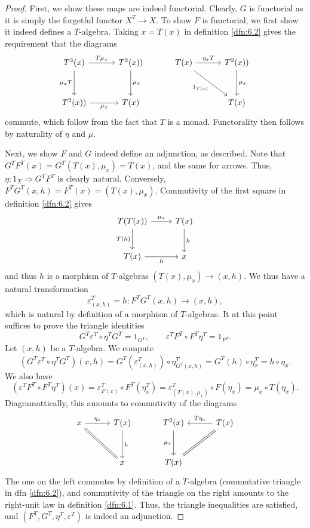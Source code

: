 \begin{proof}
	First, we show these maps are indeed functorial. Clearly, $G$ is functorial as it is simply the forgetful functor $X^T \to X$. To show $F$ is functorial, we first show it indeed defines a $T$-algebra. Taking $x=T(x)$ in definition \ref{dfn:6.2} gives the requirement that the diagrams
	\[\begin{tikzcd}[row sep = 3em, column sep = 3em]
	T^3(x)\ar[" T\mu_x ", r] \ar[" \mu_xT "', d]  & T^2(x))\ar[" \mu_x ", d]  & T(x)\ar[" \eta_xT ", r]  \ar[" 1_{T(x)}  "', dr]& T^2(x))\ar[" \mu_x ", d]  \\
	T^2(x))\ar[" \mu_x "', r]  & T(x) &  & T(x)
	\end{tikzcd}\]
	commute, which follow from the fact that $T$ is a monad. Functorality then follows by naturality of $\eta$ and $\mu$.

	Next, we show $F$ and $G$ indeed define an adjunction, as described. Note that $G^TF^T(x)=G^T(T(x),\mu_x)=T(x)$, and the same for arrows. Thus, $\eta : 1_X \Rightarrow G^TF^T$ is clearly natural. Conversely, $F^TG^T(x,h)=F^T(x)=(T(x),\mu_x)$. Commutivity of the first square in definition \ref{dfn:6.2} gives
	\[\begin{tikzcd}[row sep = 2.5em, column sep = 2.5em]
	T(T(x))\ar[" \mu_x ", r] \ar[" T(h) "', d]  & T(x)\ar[" h ", d]  \\
	T(x)\ar[" h "', r]  & x
	\end{tikzcd}\]
	and thus $h$ is a morphism of $T$-algebras $(T(x),\mu_x) \to (x,h)$. We thus have a natural transformation
	\[
		\varepsilon^T_{(x,h)} =h : F^TG^T(x,h) \to (x,h)
	,\]
	which is natural by definition of a morphism of $T$-algebras. It at this point suffices to prove the triangle identities
	\[
		G^T\varepsilon^T \circ \eta ^TG^T=1_{G^T} ,\qquad \varepsilon ^TF^T\circ F^T\eta ^T= 1_{F^T} 
	.\]
	Let $(x,h)$ be a $T$-algebra. We compute
	\[
		(G^T\varepsilon^T \circ \eta^T G^T)(x,h)=G^T(\varepsilon^T_{(x,h)}) \circ \eta^T_{G^T(x,h)} =G^T(h)\circ \eta^T_x=h\circ \eta_x
	.\]
	We also have
	\[
		(\varepsilon ^T F^T\circ F^T\eta^T)(x)=\varepsilon ^T_{F(x)} \circ F^T(\eta^T_x)=\varepsilon^T_{(T(x),\mu_x)} \circ F(\eta_x)=\mu_x \circ T(\eta_x)
	.\]
	Diagramattically, this amounts to commutivity of the diagrams
	\[\begin{tikzcd}[row sep = 3em, column sep = 3em]
	x\ar[" \eta_x ", r] \ar[equals, dr]  & T(x)\ar[" h ", d]  & T^2(x)\ar[" \mu_x "', d]  & T(x)\ar[" T\eta_x "', l] \ar[equals, dl]  \\
	 & x & T(x) & 
	\end{tikzcd}\]
	The one on the left commutes by definition of a $T$-algebra (commutative triangle in dfn \ref{dfn:6.2}), and commutivity of the triangle on the right amounts to the right-unit law in definition \ref{dfn:6.1}. Thus, the triangle inequalities are satisfied, and $(F^T,G^T,\eta^T,\varepsilon ^T)$ is indeed an adjunction.


\end{proof}

